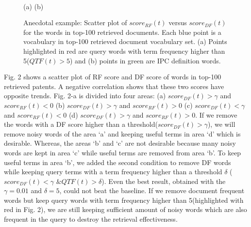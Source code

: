 \documentclass{sig-alternate}
\begin{document}
\begin{figure}[htpb]
\begin{center}
\vspace{-4mm}\\
 \hspace{5mm}(a) \hspace{38mm}(b) 
\caption{\footnotesize
Anecdotal example: Scatter plot of $ score_{RF}(t) $ versus $ score_{DF}(t) $ for the words in top-100 retrieved documents. Each blue point is a vocabulary in top-100 retrieved document vocabulary set. (a) Points highlighted in red are query words with term frequency higher than 5($ QTF(t)>5 $) and (b) points in green are IPC definition words.}
\vspace{-4mm}
\end{center}
\label{fig:dfrf}
\end{figure}
Fig. 2 shows a scatter plot of RF score and DF score of words in top-100 retrieved patents. A negative correlation shows that these two scores have opposite trends. Fig. 2-a is divided into four areas: 
(a) $score_{DF}(t)>\gamma$ and $score_{RF}(t)<0$ 
(b) $score_{DF}(t)>\gamma$ and $score_{RF}(t)>0$ 
(c) $score_{DF}(t)<\gamma$ and $score_{RF}(t)<0$
(d) $score_{DF}(t)>\gamma$ and $score_{RF}(t)>0$. 
If we remove the words with a DF score higher than a threshold($score_{DF}(t)>\gamma$), we will remove noisy words of the area `a' and keeping useful terms in area `d' which is desirable. Whereas, the areas `b' and `c' are not desirable because many noisy words are kept in area `c' while useful terms are removed from area `b'. To keep useful terms in area `b', we added the second condition to remove DF words while keeping query terms with a term frequency higher than a threshold $\delta$ ($ score_{DF}(t)<\gamma \mbox{ \& } QTF(t)>\delta$). Even the best result, obtained with the $ \gamma = 0.01 $ and $ \delta = 5 $, could not beat the baseline. If we remove document frequent words but keep query words with term frequency higher than 5(highlighted with red in Fig. 2), we are still keeping sufficient amount of noisy words which are also frequent in the query to destroy the retrieval effectiveness. 
\end{document}
